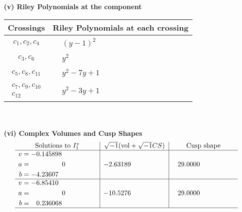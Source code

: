 \documentclass[1p]{elsarticle_modified}
\theoremstyle{definition}
\newcommand{\I}{\sqrt{-1}}
\begin{document}
\newpage\renewcommand{\arraystretch}{1}
\flushleft \textbf{(v) Riley Polynomials at the component}\newline \\
\begin{tabular}{m{50pt}|m{274pt}}
Crossings & \hspace{64pt}Riley Polynomials at each crossing \\
\hline $$\begin{aligned}c_{1},c_{2},c_{4}\end{aligned}$$&$\begin{aligned}
&(y-1)^2
\end{aligned}$\\
\hline $$\begin{aligned}c_{3},c_{6}\end{aligned}$$&$\begin{aligned}
&y^2
\end{aligned}$\\
\hline $$\begin{aligned}c_{5},c_{8},c_{11}\end{aligned}$$&$\begin{aligned}
&y^2-7 y+1
\end{aligned}$\\
\hline $$\begin{aligned}c_{7},c_{9},c_{10}\\c_{12}\end{aligned}$$&$\begin{aligned}
&y^2-3 y+1
\end{aligned}$\\
\hline
\end{tabular}\\~\\
\newpage\flushleft \textbf{(vi) Complex Volumes and Cusp Shapes}
$$\begin{array}{c|c|c}  
\text{Solutions to }I^v_{1}& \I (\text{vol} + \sqrt{-1}CS) & \text{Cusp shape}\\
 \hline 
\begin{aligned}
v &= -0.145898\phantom{ +0.000000I} \\
a &= \phantom{-0.000000 } 0 \\
b &= -4.23607\phantom{ +0.000000I}\end{aligned}
 & -2.63189\phantom{ +0.000000I} & \phantom{-}29.0000\phantom{ +0.000000I} \\ \hline\begin{aligned}
v &= -6.85410\phantom{ +0.000000I} \\
a &= \phantom{-0.000000 } 0 \\
b &= \phantom{-}0.236068\phantom{ +0.000000I}\end{aligned}
 & -10.5276\phantom{ +0.000000I} & \phantom{-}29.0000\phantom{ +0.000000I}\\
 \hline 
 \end{array}$$\newpage
\end{document}
